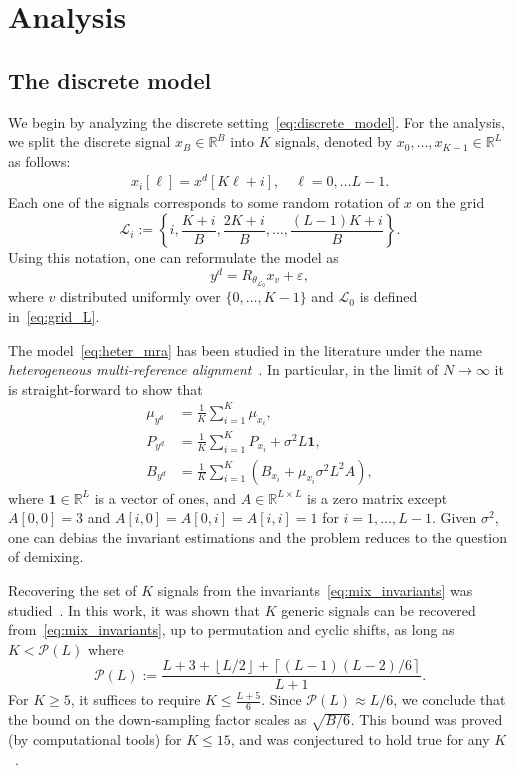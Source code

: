 \documentclass[english,12pt]{article}
\numberwithin{equation}{section}
\numberwithin{mytheorem}{section} %
\begin{document}
\section{Analysis}

\subsection{The discrete model}

We begin by analyzing the discrete setting~\eqref{eq:discrete_model}. For the analysis, we split the discrete signal $x_B\in\mathbb{R}^B$ into $K$ signals, denoted by $x_0,\ldots,x_{K-1}\in\mathbb{R}^L$ as follows:
\begin{eqnarray} \label{eq:sub_signals}
x_i[\ell] = x^d[K\ell+i], \quad \ell=0,\ldots L-1. 
\end{eqnarray}
Each one of the signals corresponds to some random rotation of $x$ on the grid  $$\mathcal{L}_i:=\left\{i,\frac{K+i}{B},\frac{2K+i}{B},\ldots,\frac{(L-1)K+i}{B}\right\}.$$
Using this notation, one can reformulate the model as 
\begin{equation} \label{eq:heter_mra}
y^d =  R_{\theta_{\mathcal{L}_0}} x_{v} + \varepsilon,
\end{equation}
where $v$ distributed uniformly over $\{0,\ldots,K-1\}$ and $\mathcal{L}_0$ is defined in~\eqref{eq:grid_L}. 

The model~\eqref{eq:heter_mra} has been studied in the literature under the name \emph{heterogeneous multi-reference alignment}~\cite{perry2017sample,bandeira2017estimation,boumal2018heterogeneous}. In particular, in the limit of $N\to\infty$ it is straight-forward to show that 
\begin{align} \label{eq:mix_invariants}
\mu_{y^d} &= \frac{1}{K}\sum_{i=1}^K \mu_{x_i}, \nonumber\\
P_{y^d} &= \frac{1}{K}\sum_{i=1}^K P_{x_i} + \sigma^2L\mathbf{1}, \\
B_{y^d} &= \frac{1}{K}\sum_{i=1}^K (B_{x_i} +\mu_{x_i}\sigma^2L^2 A ), \nonumber
\end{align}
where $\mathbf{1}\in\mathbb{R}^L$ is a vector of ones, and $A\in\mathbb{R}^{L\times L}$ is a zero matrix except $A[0,0]=3$ and $A[i,0]=A[0,i]=A[i,i]=1$ for $i=1,\ldots,L-1$.
Given $\sigma^2$, one can debias the invariant estimations and the problem reduces to the question of demixing.

Recovering the set of $K$ signals from the invariants~\eqref{eq:mix_invariants} was studied~\cite{bandeira2017estimation}. In this work, it was shown that $K$ generic signals can be recovered from~\eqref{eq:mix_invariants}, up to permutation and cyclic shifts, as long as $K<\mathcal{P}(L)$ where
\begin{equation} \label{eq:Pl}
\mathcal{P}(L) := \frac{L+3+\left\lfloor L/2\right\rfloor +  \left\lceil (L-1)(L-2)/6\right\rceil}{L+1}.
\end{equation}
For $K\geq 5$, it suffices to require $K\leq \frac{L+5}{6}$. 
Since $\mathcal{P}(L) \approx L/6$, we conclude that the bound on the down-sampling factor scales as $\sqrt{B/6}$.
This bound was proved (by computational tools) for $K\leq 15$, and was conjectured to hold true for any $K$~\cite{bandeira2017estimation}.
\end{document}
